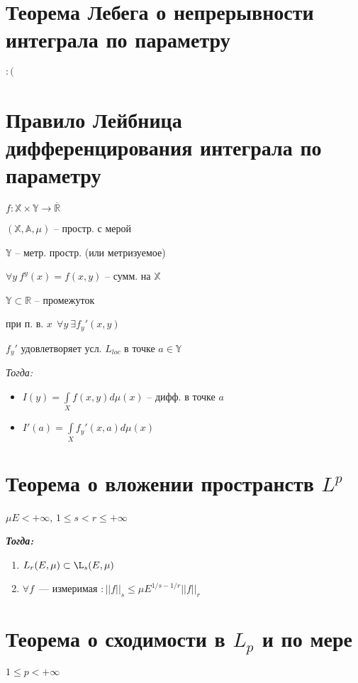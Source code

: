 \documentclass[paper=a4, fontsize=14pt]{report}
\begin{document}
\section{Теорема Лебега о непрерывности интеграла по параметру}

$:($

\section{Правило Лейбница дифференцирования интеграла по параметру}

$ f : \mathbb{X} \times \mathbb{Y} \rightarrow \overline{\mathbb{R}}$

$ (\mathbb{X}, \mathbb{A}, \mu) $ -- простр. с мерой

$ \mathbb{Y} $ -- метр. простр. (или метризуемое)

$ \forall y ~ f^y(x) = f(x, y) $ -- сумм. на $ \mathbb{X} $

\bigskip

$ \mathbb{Y} \subset \mathbb{R} $ -- промежуток

при п. в. $ x ~~ \forall y ~ \exists f_y'(x, y)$

$ f_y' $ удовлетворяет усл. $ L_{loc} $ в точке $ a \in \mathbb{Y}$

\emph{Тогда:}
\begin{itemize}
	\item $ I(y) = \int\limits_{X} f(x, y) d\mu(x) $ -- дифф. в точке $ a $
	\item $ I'(a) = \int\limits_{X} f_y'(x, a) d\mu(x) $
\end{itemize}

\section{Теорема о вложении пространств $L^p$}

$ \mu E < +\infty$, $1 \leq s < r \leq + \infty$

\textbf{\emph{Тогда:}}

\begin{enumerate}
	\item $ L_r(E, \mu)  \subset \L_s(E, \mu)$
	\item $ \forall f$~--- измеримая $: ||f||_s \leq \mu E^{1/s - 1/r} ||f||_r$
\end{enumerate}

\section{Теорема о сходимости в $L_p$ и по мере}
$ 1 \leq p < +\infty $
\end{document}
